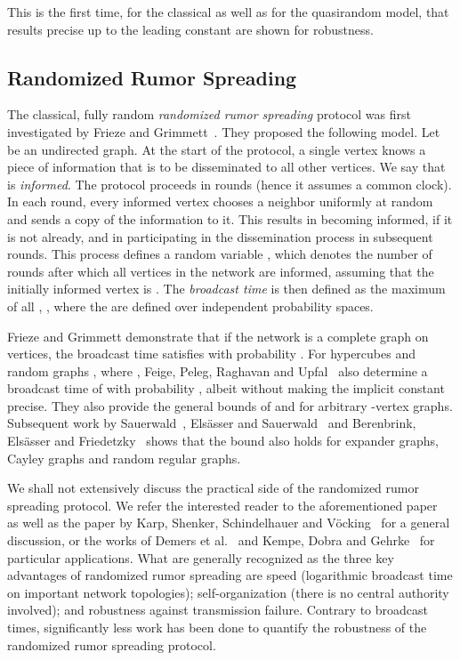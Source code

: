 \documentclass[12pt]{article}
\begin{document}
{  This is the first time, for the classical as well as for the quasirandom model, that results precise up to the leading constant are shown for robustness. 
  
\subsection{Randomized Rumor Spreading}

  The classical, fully random \emph{randomized rumor spreading} protocol was first investigated by Frieze and Grimmett~\cite{FG85}. They proposed the following model. Let  be an undirected graph. At the start of the protocol, a single vertex  knows a piece of information that is to be disseminated to all other vertices. We say that  is \emph{informed}. The protocol proceeds in rounds (hence it assumes a common clock). In each round, every informed vertex  chooses a neighbor  uniformly at random and sends a copy of the information to it. This results in  becoming informed, if it is not already, and in  participating in the dissemination process in subsequent rounds. This process defines a random variable , which denotes the number of rounds after which all vertices in the network are informed, assuming that the initially informed vertex is . The \emph{broadcast time}  is then defined as the maximum of all , , where the  are defined over independent probability spaces.
  
  Frieze and Grimmett demonstrate that if the network is a complete graph on  vertices, the broadcast time satisfies  with probability . For hypercubes and random graphs , where , Feige, Peleg, Raghavan and Upfal~\cite{FPRU90} also determine a broadcast time of  with probability , albeit without making the implicit constant precise. They also provide the general bounds of  and  for arbitrary -vertex graphs. Subsequent work by Sauerwald~\cite{S07}, Els\"asser and Sauerwald~\cite{ES07} and Berenbrink, Els\"asser and Friedetzky~\cite{BEF08} shows that the  bound also holds for expander graphs, Cayley graphs and random regular graphs.
  
  We shall not extensively discuss the practical side of the randomized rumor spreading protocol. We refer the interested reader to the aforementioned paper~\cite{FPRU90} as well as the paper by Karp, Shenker, Schindelhauer and V\"ocking~\cite{KSSV00} for a general discussion, or the works of Demers et al.~\cite{DGH+88} and Kempe, Dobra and Gehrke~\cite{KDG03} for particular applications. What are generally recognized as the three key advantages of randomized rumor spreading are speed (logarithmic broadcast time on important network topologies); self-organization (there is no central authority involved); and robustness against transmission failure. Contrary to broadcast times, significantly less work has been done to quantify the robustness of the randomized rumor spreading protocol.
  
}
\end{document}

